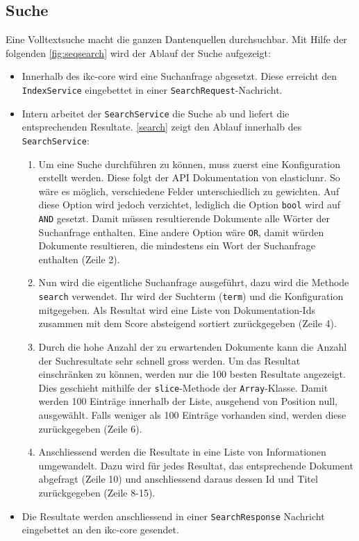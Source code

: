 
\subsection{Suche}


Eine Volltextsuche macht die ganzen Dantenquellen durchsuchbar. Mit Hilfe der folgenden \autoref{fig:seqsearch} wird der Ablauf der Suche aufgezeigt:
\begin{itemize}
    \item Innerhalb des \gls{ikc-core} wird eine Suchanfrage abgesetzt. Diese erreicht den \texttt{IndexService} eingebettet in einer \texttt{SearchRequest}-Nachricht. 
    \item Intern arbeitet der \texttt{SearchService} die Suche ab und liefert die entsprechenden Resultate. \autoref{search} zeigt den Ablauf innerhalb des \texttt{SearchService}:
    \begin{enumerate}
        \item Um eine Suche durchführen zu können, muss zuerst eine Konfiguration erstellt werden. Diese folgt der API Dokumentation von \gls{elasticlunr}. So wäre es möglich, verschiedene Felder unterschiedlich zu gewichten. Auf diese Option wird jedoch verzichtet, lediglich die Option \texttt{bool} wird auf \texttt{AND} gesetzt. Damit müssen resultierende Dokumente alle Wörter der Suchanfrage enthalten. Eine andere Option wäre \texttt{OR}, damit würden Dokumente resultieren, die mindestens ein Wort der Suchanfrage enthalten (Zeile 2).
        \item Nun wird die eigentliche Suchanfrage ausgeführt, dazu wird die Methode \texttt{search} verwendet. Ihr wird der Suchterm (\texttt{term}) und die Konfiguration mitgegeben. Als Resultat wird eine Liste von Dokumentation-Ids zusammen mit dem \gls{Score} absteigend sortiert zurückgegeben (Zeile 4).
        \item Durch die hohe Anzahl der zu erwartenden Dokumente kann die Anzahl der Suchresultate sehr schnell gross werden. Um das Resultat einschränken zu können, werden nur die 100 besten Resultate angezeigt. Dies geschieht mithilfe der \texttt{slice}-Methode der \texttt{Array}-Klasse. Damit werden 100 Einträge innerhalb der Liste, ausgehend von Position null, ausgewählt. Falls weniger als 100 Einträge vorhanden sind, werden diese zurückgegeben (Zeile 6).
        \item Anschliessend werden die Resultate in eine Liste von Informationen umgewandelt. Dazu wird für jedes Resultat, das entsprechende Dokument abgefragt (Zeile 10) und anschliessend daraus dessen Id und Titel zurückgegeben (Zeile 8-15).
    \end{enumerate}
    \item Die Resultate werden anschliessend in einer \texttt{SearchResponse} Nachricht eingebettet an den \gls{ikc-core} gesendet.
\end{itemize}

